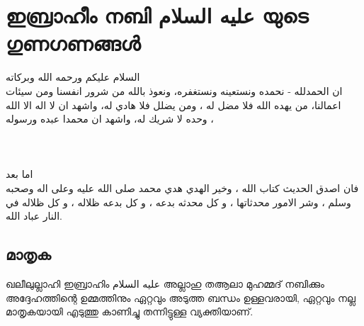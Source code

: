 \chapter*{\textmalayalam{ഇബ്രാഹീം നബി} \textarabic{عليه السلام} \textmalayalam{യുടെ ഗുണഗണങ്ങൾ}}


{السلام عليكم ورحمه الله وبركاته} \\

%


 ان الحمدلله - نحمده ونستعينه ونستغفره، ونعوذ بالله من شرور انفسنا ومن سيئات اعمالنا، من يهده الله فلا مضل له ، ومن يضلل فلا هادي له، واشهد ان لا اله الا الله وحده لا شريك له، واشهد ان محمدا عبده ورسوله ، \\ 
 
 \quranayah[3][102] 
 ~ \\
  \quranayah[4][1] 
  ~ \\
    \quranayah[33][70] 
     \quranayah[33][71] 
    ~ \\
 اما بعد  \\ 
 
 فان اصدق الحديث كتاب الله ، وخير الهدي هدي محمد صلى الله عليه وعلى اله وصحبه وسلم ، وشر الامور محدثاتها ، و كل محدثه بدعه ، و كل بدعه ظلاله ، و كل ظلاله في النار عباد الله. \\ 
 
 
 
 
 \section*{മാതൃക}
 ഖലീലുല്ലാഹി ഇബ്രാഹിം  \textarabic{عليه السلام} അല്ലാഹു തആലാ മുഹമ്മദ് നബിക്കും അദ്ദേഹത്തിന്റെ ഉമ്മത്തിനും ഏറ്റവും അടുത്ത ബന്ധം ഉള്ളവരായി,  ഏറ്റവും നല്ല മാതൃകയായി എടുത്തു കാണിച്ചു തന്നിട്ടുള്ള വ്യക്തിയാണ്. \\
 
